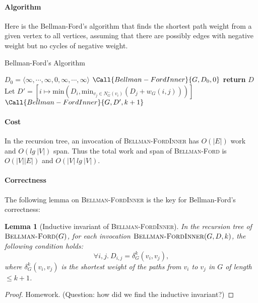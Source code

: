 \documentclass[11pt,a4paper,oneside,microtype,nokorean]{oblivoir}
\newtheorem{lemma}[theorem]{Lemma}
\begin{document}
\paragraph{Algorithm}

Here is the Bellman-Ford's algorithm that finds the shortest path weight from a given vertex to all
vertices, assuming that there are possibly edges with negative weight but no cycles of negative
weight.

\begin{algorithm}
  \caption{Bellman-Ford's Algorithm}\label{dijkstra}
  \begin{algorithmic}[1]
     
    \State $D_0 = \langle \infty, \cdots, \infty, 0, \infty, \cdots, \infty \rangle$ 
    \State $\Call{Bellman-FordInner}{G,D_0,0}$
    \EndProcedure
    \Statex
     
    \State \textbf{return} $D$
    \EndIf
    \State Let $D' = [i \mapsto \textrm{min}(D_i, \textrm{min}_{v_j \in N^-_G(v_i)} (D_j + w_G(i,j)))]$
    \State $\Call{Bellman-FordInner}{G,D',k+1}$
    \EndProcedure
  \end{algorithmic}
\end{algorithm}


\paragraph{Cost}

In the recursion tree, an invocation of \textsc{Bellman-FordInner} has $O(|E|)$ work and $O(lg~|V|)$
span.  Thus the total work and span of \textsc{Bellman-Ford} is $O(|V||E|)$ and $O(|V|~lg~|V|)$.



\paragraph{Correctness} The following lemma on \textsc{Bellman-FordInner} is the key for Bellman-Ford's
correctness:

\begin{lemma}[Inductive invariant of \textsc{Bellman-FordInner}] In the recursion tree of
  $\textsc{Bellman-Ford}(G)$, for each invocation $\textsc{Bellman-FordInner}(G,D,k)$, the
  following condition holds:
  \[ \forall i,j.~D_{i,j} = \delta_G^k(v_i,v_j),
  \]  
  where $\delta_G^k(v_i,v_j)$ is the shortest weight of the paths from $v_i$ to $v_j$ in $G$ of
  length $\le k+1$.
\end{lemma}
\begin{proof}
  Homework.  (Question: how did we find the inductive invariant?)
\end{proof}
\end{document}
